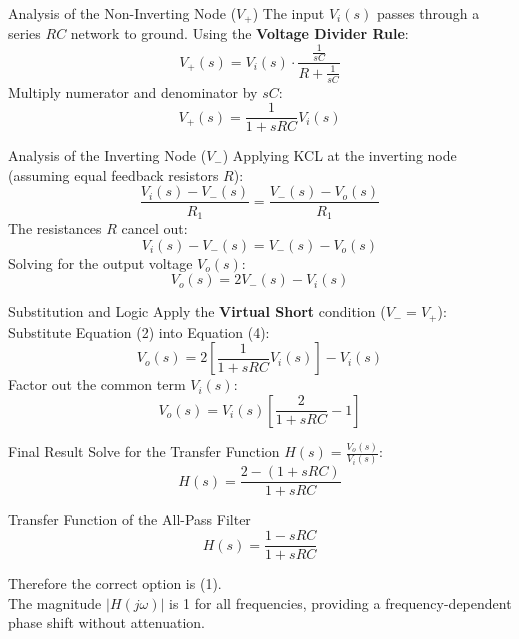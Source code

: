 \documentclass{beamer}
\begin{document}
\begin{frame}{Analysis of the Non-Inverting Node ($V_+$)}
    The input $V_i(s)$ passes through a series $RC$ network to ground. Using the \textbf{Voltage Divider Rule}:
    \begin{equation}
        V_+(s) = V_i(s) \cdot \frac{\frac{1}{sC}}{R + \frac{1}{sC}}
    \end{equation}
    \vfill
    Multiply numerator and denominator by $sC$:
    \begin{equation}
        V_+(s) = \frac{1}{1 + sRC} V_i(s)
    \end{equation}
\end{frame}

\begin{frame}{ Analysis of the Inverting Node ($V_-$)}
    Applying KCL at the inverting node (assuming equal feedback resistors $R$):
    \begin{equation}
        \frac{V_i(s) - V_-(s)}{R_1} = \frac{V_-(s) - V_o(s)}{R_1}
    \end{equation}
    \vfill
    The resistances $R$ cancel out:
    \begin{equation*}
        V_i(s) - V_-(s) = V_-(s) - V_o(s)
    \end{equation*}
    \vfill
    Solving for the output voltage $V_o(s)$:
    \begin{equation}
        V_o(s) = 2V_-(s) - V_i(s)
    \end{equation}
\end{frame}

\begin{frame}{ Substitution and Logic}
    Apply the \textbf{Virtual Short} condition ($V_- = V_+$):
    \vfill
    Substitute Equation (2) into Equation (4):
    \begin{equation}
        V_o(s) = 2 \left[ \frac{1}{1 + sRC} V_i(s) \right] - V_i(s)
    \end{equation}
    \vfill
    Factor out the common term $V_i(s)$:
    \begin{equation}
        V_o(s) = V_i(s) \left[ \frac{2}{1 + sRC} - 1 \right]
    \end{equation}
\end{frame}

\begin{frame}{ Final Result}
    Solve for the Transfer Function $H(s) = \frac{V_o(s)}{V_i(s)}$:
    \vfill
    \begin{equation*}
        H(s) = \frac{2 - (1 + sRC)}{1 + sRC}
    \end{equation*}
    \vfill
    \begin{block}{Transfer Function of the All-Pass Filter}
        \begin{equation}
            H(s) = \frac{1 - sRC}{1 + sRC}
        \end{equation}
    \end{block}
    \vfill
    Therefore the correct option is (1).\\
    The magnitude $|H(j\omega)|$ is 1 for all frequencies, providing a frequency-dependent phase shift without attenuation.
\end{frame}
\end{document}
